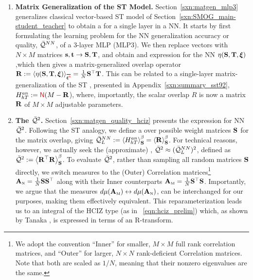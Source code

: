 
\begin{enumerate}[label=5.\arabic*]
\item
\textbf{Matrix Generalization of the ST Model.}
Section~\ref{sxn:matgen_mlp3} generalizes
classical \STATMECH vector-based ST model of Section~\ref{sxn:SMOG_main-student_teacher}
to obtain a \LayerQuality for a single layer in a NN.
It starts by first formulating the learning problem for
the NN generalization accuracy or quality, $\bar{\mathcal{Q}}^{NN}$,
of a 3-layer MLP (MLP3).
We then replace vectors with $N \times M$ matrices ${\mathbf{s}},{\mathbf{t}}\rightarrow{\mathbf{S}},{\mathbf{T}}$,
and obtain and expression for the NN \SelfOverlap $\eta({\mathbf{S}},{\mathbf{T}},\boldsymbol{\xi})$,which then gives a matrix-generalized overlap operator
$\OVERLAP:=\langle\ETA(\SMAT,\TMAT,\XI)\rangle_{\AVGNDXI}=\tfrac{1}{N}\SMAT^{\top}\TMAT$.
This can be related to a single-layer matrix-generalization of the ST \AnnealedHamiltonian, 
presented in Appendix~\ref{sxn:summary_sst92},
$H^{an}_{hT}:={\color{red}\sf{N}}(M-\mathbf{R}$),
where, importantly, the scalar overlap $R$ is now a matrix $\mathbf{R}$ of $M\times M$ adjustable parameters.

\item
\textbf{The \LayerQualitySquared $\bar{\mathcal{Q}}^{2}$.}
Section~\ref{sxn:matgen_quality_hciz} presents the expression for NN \LayerQualitySquared $\bar{\mathcal{Q}}^{2}$.
Following the ST analogy, we define a \ThermalAverage over possible \Student weight matrices ${\mathbf{S}}$
for the matrix overlap, giving $\bar{\mathcal{Q}}^{NN}_{L}:=\left\langle H^{an}_{hT} \right\rangle_{\mathbf S}^{\beta} =\left\langle \mathbf{R} \right\rangle_{\mathbf S}^{\beta}$.
For technical reasons, however, we actually seek the (approximate)  \LayerQualitySquared, $\bar{\mathcal{Q}}^{2}\approx (\bar{\mathcal{Q}}^{NN}_{L})^2$,
defined as $\bar{\mathcal{Q}}^{2}:=\left\langle {\mathbf{R}}^{\top}\mathbf{R} \right\rangle_{\mathbf S}^{\beta}$.
To evaluate $\bar{\mathcal{Q}}^{2}$, rather than sampling all random \Student matrices ${\mathbf{S}}$ directly,
we switch measures to the (Outer) \Student Correlation matrices\footnote{
We adopt the convention ``Inner'' for smaller, $M\times M$ full rank \Student correlation matrices, and ``Outer'' for larger, $N\times N$ rank-deficient \Student Correlation matrices.
Note that both are scaled as $1 / N$, meaning that their nonzero eigenvalues are the same.
} 
${\mathbf{A}}_{\text{\tiny N}} = \tfrac{1}{N}{\mathbf{S}}{\mathbf{S}}^{\top}$ along with their Inner counterparts
${\mathbf{A}}_{\text{\tiny M}} = \tfrac{1}{N}{\mathbf{S}}^{\top}{\mathbf{S}}$.
Importantly, we argue that the measures $d\mu({\mathbf{A}}_{\text{\tiny M}})\leftrightarrow d\mu({\mathbf{A}}_{\text{\tiny N}})$,
can be interchanged for our purposes, making them effectively equivalent.
This reparameterization leads us to an integral of the HCIZ type (as in \EQN~\ref{eqn:hciz_prelim})
which, as shown by Tanaka \cite{Tanaka2007, Tanaka2008}, is expressed in terms of an R-transform.


\end{enumerate}
